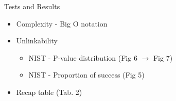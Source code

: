 \begin{frame}{Tests and Results}
    \begin{itemize}
        \item Complexity - Big O notation
        \item Unlinkability
        \begin{itemize}
            \item NIST - P-value distribution (Fig 6 $\rightarrow$ Fig 7)
            \item NIST - Proportion of success (Fig 5)
        \end{itemize}
        \item Recap table (Tab. 2)
    \end{itemize}
\end{frame}